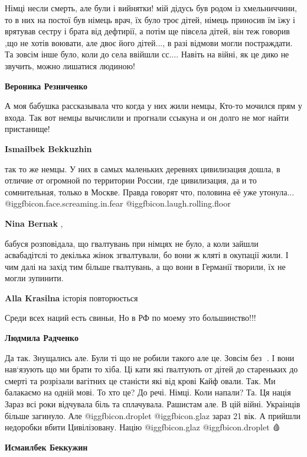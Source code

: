 \begin{itemize}
\begin{itemize}

Німці несли смерть, але були і вийнятки! мій дідусь був родом із хмельниччини,
то в них на постої був німець врач, їх було троє дітей, німець приносив їм їжу і
врятував сестру і брата від дефтирії, а потім ще півсела дітей, він теж говорив
,що не хотів воювати, але двоє його дітей..., в разі відмови могли постраждати.
Та зовсім інше було, коли до села ввійшли сс.... Навіть на війні, як це дико не
звучить, можно лишатися людиною!

\textbf{Вероника Резниченко} 

А моя бабушка рассказывала что когда у них жили немцы, Кто-то мочился прям у
входа. Так вот немцы вычислили и прогнали ссыкуна и он долго не мог найти
пристанище!

\textbf{Ismailbek Bekkuzhin} 

так то же немцы. У них в самых маленьких деревнях цивилизация дошла, в отличие
от огромной по территории России, где цивилизация, да и то сомнительная, только
в Москве. Правда говорят что, половина её уже утонула...  @igg{fbicon.face.screaming.in.fear}  @igg{fbicon.laugh.rolling.floor} 

\textbf{Nina Bernak} , 

бабуся розповідала, що гвалтувань при німцях не було, а коли зайшли
асвабадітєлі то декілька жінок згвалтували, бо вони ж кляті в окупації жили. І
чим далі на захід тим більше гвалтувань, а що вони в Германії творили, їх не
могли зупинити.

\textbf{Alla Krasilna} історія повторюється

Среди всех наций есть свиньи, Но в РФ по моему это большинство!!!

\textbf{Людмила Радченко} 

Да так. Знущались але. Були ті що не робили такого але це. Зовсім без 🧠. І
вони нав‘язують що ми брати то хіба. Ці кати які ґвалтують от дітей до
стареньких до смерті та розрізали вагітних це станісти які від крові Кайф
овали. Так. Ми балакаємо на одній мові. То хто це? До речі. Німці. Коли напали?
Та. Ця нація Зараз всі роки відчувала біль та сплачувала. Рашистам але. В цій
війні. Украінців більше загинуло. Але  @igg{fbicon.droplet}  @igg{fbicon.glaz} зараз 21 вік. А прийшли недоробки
вбити Цивілізовану. Націю @igg{fbicon.glaz}  @igg{fbicon.droplet} 🩸

\textbf{Исмаилбек Беккужин} 


\end{itemize}
\end{itemize}
